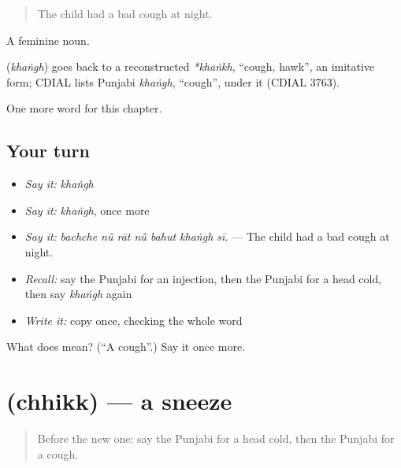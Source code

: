 \begin{quote}
The child had a bad cough at night.
\end{quote}

A feminine noun.

\begin{cousinweb}
\textbf{} (\emph{khaṅgh}) goes back to a reconstructed \emph{*khaṅkh}, \textquotedblleft{}cough, hawk\textquotedblright{}, an imitative form; CDIAL lists Punjabi \emph{khaṅgh}, \textquotedblleft{}cough\textquotedblright{}, under it (CDIAL 3763).
\end{cousinweb}

\begin{grammarlens}[title={What you've built}]
One more word for this chapter.
\end{grammarlens}

\subsection*{Your turn}
\begin{itemize}
\raggedright
  \item \emph{Say it:} \emph{khaṅgh}
  \item \emph{Say it:} \emph{khaṅgh}, once more
  \item \emph{Say it:} \emph{bachche nū̃ rāt nū̃ bahut khaṅgh sī.} — The child had a bad cough at night.
  \item \emph{Recall:} say the Punjabi for an injection, then the Punjabi for a head cold, then say \emph{khaṅgh} again
  \item \emph{Write it:} copy \textbf{} once, checking the whole word
\end{itemize}

\begin{tcolorbox}[breakable,colback=teal!4,colframe=teal!35!black,title={Before you move on}]
What does  mean? (\textquotedblleft{}A cough\textquotedblright{}.) Say it once more.
\end{tcolorbox}
\section[\texorpdfstring{\pa{ਛਿੱਕ} (chhikk)}{ਛਿੱਕ (chhikk)}]{ (chhikk) — a sneeze}

\label{lesson:PA-C321-chhikk}



\begin{quote}
Before the new one: say the Punjabi for a head cold, then the Punjabi for a cough.
\end{quote}

